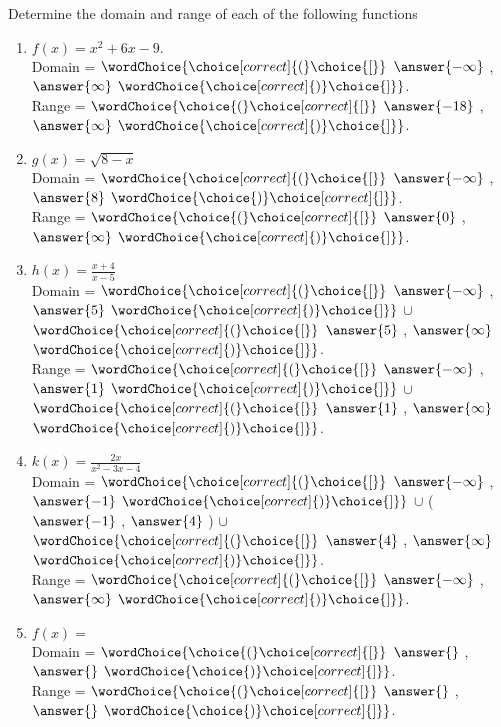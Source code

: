 \documentclass{ximera}
\author{Elizabeth Campolongo}
\begin{document}
\begin{exercise}
Determine the domain and range of each of the following functions
%
\begin{enumerate}

\item $f(x) = x^2+6x-9.$\\
Domain = $\wordChoice{\choice[correct]{(}\choice{[}}$ $\answer{-\infty}$ , $\answer{\infty}$ $\wordChoice{\choice[correct]{)}\choice{]}}$.\\
Range = $\wordChoice{\choice{(}\choice[correct]{[}}$ $\answer{-18}$ , $\answer{\infty}$ $\wordChoice{\choice[correct]{)}\choice{]}}$.


\item $g(x) = \sqrt{8-x} $\\
Domain = $\wordChoice{\choice[correct]{(}\choice{[}}$ $\answer{-\infty}$ , $\answer{8}$ $\wordChoice{\choice{)}\choice[correct]{]}}$.\\
Range = $\wordChoice{\choice{(}\choice[correct]{[}}$ $\answer{0}$ , $\answer{\infty}$ $\wordChoice{\choice[correct]{)}\choice{]}}$.


\item $h(x) =  \frac{x+4}{x-5}$\\
Domain = $\wordChoice{\choice[correct]{(}\choice{[}}$ 
$\answer{-\infty}$ , $\answer{5}$ 
$\wordChoice{\choice[correct]{)}\choice{]}}$ 
$\cup$  
$\wordChoice{\choice[correct]{(}\choice{[}}$ 
$\answer{5}$ , $\answer{\infty}$ 
$\wordChoice{\choice[correct]{)}\choice{]}}$.\\
Range = $\wordChoice{\choice[correct]{(}\choice{[}}$ 
$\answer{-\infty}$ , $\answer{1}$ 
$\wordChoice{\choice[correct]{)}\choice{]}}$ 
$\cup$  
$\wordChoice{\choice[correct]{(}\choice{[}}$ 
$\answer{1}$ , $\answer{\infty}$ 
$\wordChoice{\choice[correct]{)}\choice{]}}$.

\item $k(x)= \frac{2x}{x^2-3x-4}$\\
Domain = $\wordChoice{\choice[correct]{(}\choice{[}}$ 
$\answer{-\infty}$ , $\answer{-1}$ 
$\wordChoice{\choice[correct]{)}\choice{]}}$ 
$\cup$  
\Big( 
$\answer{-1}$ , $\answer{4}$ 
\Big)
$\cup$  
$\wordChoice{\choice[correct]{(}\choice{[}}$ 
$\answer{4}$ , $\answer{\infty}$ 
$\wordChoice{\choice[correct]{)}\choice{]}}$.\\
Range = $\wordChoice{\choice[correct]{(}\choice{[}}$ 
$\answer{-\infty}$ , $\answer{\infty}$ 
$\wordChoice{\choice[correct]{)}\choice{]}}$.


\item $f(x) = $ \\
Domain = $\wordChoice{\choice{(}\choice[correct]{[}}$ $\answer{}$ , $\answer{}$ $\wordChoice{\choice{)}\choice[correct]{]}}$.\\
Range = $\wordChoice{\choice{(}\choice[correct]{[}}$ $\answer{}$ , $\answer{}$ $\wordChoice{\choice{)}\choice[correct]{]}}$.



\end{enumerate}
\end{exercise}
\end{document}
